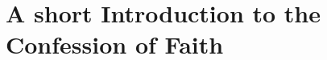 \documentclass[../main.tex]{subfiles}
\begin{document}
	
	\chapter{A short Introduction to the Confession of Faith}
	
	
	
	\theendnotes
	\setcounter{endnote}{0}
\end{document}

